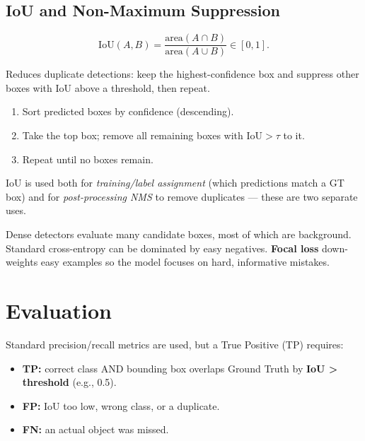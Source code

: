 \documentclass[11pt, oneside]{book}
\begin{document}
\subsection{IoU and Non-Maximum Suppression}

\begin{thmbox}[title={Intersection over Union}]
\[
\mathrm{IoU}(A,B)=\frac{\mathrm{area}(A\cap B)}{\mathrm{area}(A\cup B)}\in[0,1].
\]
\end{thmbox}

\begin{defbox}[title={Non-Maximum Suppression (NMS)}]
Reduces duplicate detections: keep the highest-confidence box and suppress other boxes with IoU above a threshold, then repeat.
\begin{enumerate}
  \item Sort predicted boxes by confidence (descending).
  \item Take the top box; remove all remaining boxes with $\mathrm{IoU}>\tau$ to it.
  \item Repeat until no boxes remain.
\end{enumerate}
\end{defbox}

IoU is used both for \emph{training/label assignment} (which predictions match a GT box) and for
\emph{post-processing NMS} to remove duplicates --- these are two separate uses.

Dense detectors evaluate many candidate boxes, most of which are background. Standard cross-entropy can be
dominated by easy negatives. \textbf{Focal loss} down-weights easy examples so the model focuses on hard,
informative mistakes.

\section{Evaluation}

\begin{defbox}[title={Detection Evaluation Basics}]
Standard precision/recall metrics are used, but a True Positive (TP) requires:
\begin{itemize}
  \item \textbf{TP:} correct class AND bounding box overlaps Ground Truth by \textbf{IoU > threshold} (e.g., 0.5).
  \item \textbf{FP:} IoU too low, wrong class, or a duplicate.
  \item \textbf{FN:} an actual object was missed.
\end{itemize}
\end{defbox}
\end{document}
